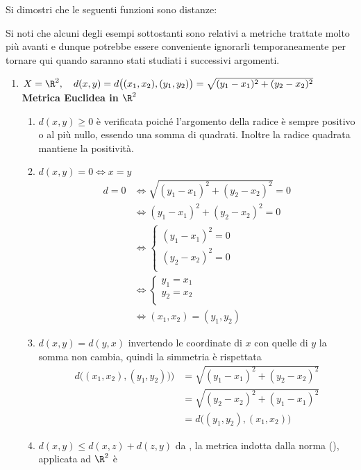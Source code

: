 \begin{example}
	\label{ex:metriche}
	Si dimostri che le seguenti funzioni sono distanze:
	\begin{note}
		Si noti che alcuni degli esempi sottostanti sono relativi a metriche trattate molto più avanti e dunque potrebbe essere conveniente ignorarli temporaneamente per tornare qui quando saranno stati studiati i successivi argomenti.
	\end{note}
	\begin{enumerate}
		\item $X=\R^2,\quad d(x,y) = d\bigl((x_1,x_2),(y_1,y_2)\bigr) = \sqrt{(y_1-x_1)^2+(y_2-x_2)^2}$
			\hfill {
				\footnotesize\textbf{Metrica Euclidea in $\R^2$}
			}
			\begin{enumerate}[label=\arabic*]
				\item $d(x,y) \geq 0$ è verificata poiché l'argomento della radice è sempre positivo o al più nullo, essendo una somma di quadrati. Inoltre la radice quadrata mantiene la positività.
				\item $d(x,y) = 0 \iff x = y$
					\begin{align*}
						d = 0 &\iff \sqrt{(y_1-x_1)^2+(y_2-x_2)^2} = 0\\
						&\iff (y_1-x_1)^2+(y_2-x_2)^2 = 0\\
						&\iff \begin{cases}
							(y_1-x_1)^2=0\\
							(y_2-x_2)^2=0\\
						\end{cases}\\
						&\iff
						\begin{cases}
							y_1=x_1\\
							y_2=x_2\\
						\end{cases}\\
						&\iff (x_1,x_2)=(y_1,y_2)
					\end{align*}
				\item $d(x,y) = d(y,x)$ invertendo le coordinate di $x$ con quelle di $y$ la somma non cambia, quindi la simmetria è rispettata
					\begin{align*}
						d\bigl((x_1,x_2),(y_1,y_2)\bigr) \bigr)
						&= \sqrt{(y_1-x_1)^2+(y_2-x_2)^2}\\
						&= \sqrt{(y_2-x_2)^2+(y_1-x_1)^2}\\
						&= d\bigl((y_1,y_2),(x_1,x_2)\bigr)
					\end{align*}
				\item $d(x,y) \leq d(x,z) + d(z,y)$ da , la metrica indotta dalla norma (), applicata ad $\R^2$ è

\end{enumerate}
\end{enumerate}
\end{example}
